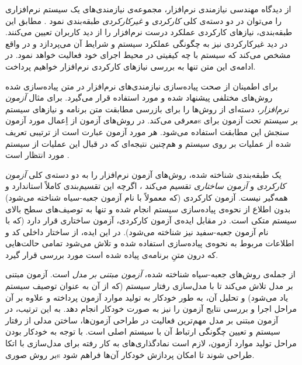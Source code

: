 از دیدگاه مهندسی نیازمند‌ی نرم‌افزار، مجموعه‌ی نیازمندی‌های یک سیستم نرم‌افزاری را می‌توان در دو دسته‌ی کلی {\it کارکردی} و {\it غیرکارکردی} طبقه‌بندی نمود \cite{Greene05}. مطابق این طبقه‌بندی، نیازهای کارکردی عملکرد درست نرم‌افزار را از دید کاربران تعیین می‌کنند. در دید غیرکارکردی نیز به چگونگی عملکرد سیستم و شرایط آن می‌پردازد و در واقع مشخص می‌کند که سیستم با چه کیفیتی در محیط اجرای خود فعالیت خواهد نمود. در ادامه‌ی این متن تنها به بررسی نیازهای کارکردی نرم‌افزار خواهیم پرداخت.

برای اطمینان از صحت پیاده‌سازی نیازمندی‌های نرم‌افزار در متن پیاده‌سازی شده روش‌های مختلفی پیشنهاد شده و مورد استفاده قرار می‌گیرد. برای مثال \emph{آزمون نرم‌افزار}، دسته‌ای از روش‌ها را برای بازرسی \gls*{مطابقت} متن برنامه و نیازهای سیستم معرفی می‌کند. در روش‌های آزمون از اِعمال \glspl*{مورد آزمون} بر سیستم تحت آزمون برای سنجش این مطابقت استفاده می‌شود. هر مورد آزمون عبارت است از ترتیبی تعریف شده از عملیات بر روی سیستم و هم‌چنین نتیجه‌ای که در قبال این عملیات از سیستم مورد انتظار است \cite{ammann08}.

یک طبقه‌بندی شناخته شده، روش‌های آزمون نرم‌افزار را به دو دسته‌ی کلی \emph{آزمون کارکردی} و \emph{آزمون ساختاری} تقسیم می‌کند \cite{Jorgensen08}، اگرچه این تقسیم‌بندی کاملاً استاندارد و همه‌گیر نیست. آزمون کارکردی (که معمولاً با نام آزمون جعبه-سیاه شناخته می‌شود) بدون اطلاع از نحوه‌ی پیاده‌سازی سیستم‌ انجام شده و تنها به توصیف‌های سطح بالای سیستم متکی است. در مقابل ایده‌ی آزمون کارکردی، آزمون ساختاری قرار دارد (که با نام آزمون جعبه-سفید نیز شناخته‌ می‌شود). در این ایده، از ساختار داخلی کد و اطلاعات مربوط به نحوه‌ی پیاده‌سازی استفاده شده و تلاش می‌شود تمامی حالت‌هایی که درون متنِ برنامه‌ی پیاده شده است مورد بررسی قرار گیرد.

از جمله‌ی روش‌های جعبه‌-سیاه شناخته شده، \emph{آزمون مبتنی بر مدل}\cite{Ap97modelbased} است. آزمون مبتنی بر مدل تلاش می‌کند تا با مدل‌سازی رفتار سیستم (که از آن  به عنوان توصیف سیستم یاد می‌شود) و تحلیل آن، به طور خودکار به تولید موارد آزمون پرداخته و علاوه بر آن مراحل اجرا و بررسی نتایج آزمون را نیز به صورت خودکار انجام دهد. به این ترتیب، در آزمون مبتنی بر مدل مهم‌ترین فعالیت در طراحی آزمون‌ها، ساختن مدلی از  رفتار سیستم و تعیین چگونگی ارتباط آن با سیستم اصلی است. با توجه به خودکار بودن مراحل تولید موارد آزمون، لازم است نمادگذاری‌های به کار رفته برای مدل‌سازی با اتکا بر \glspl*{روش صوری} طراحی شوند تا امکان پردازش خودکار آن‌ها فراهم شود.

